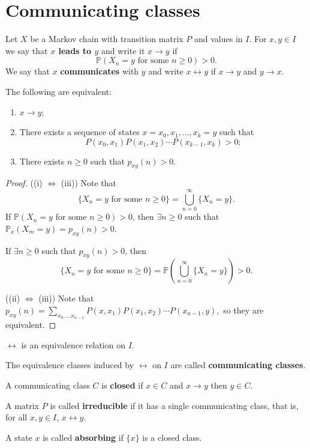\documentclass[a4paper]{article}
\begin{document}
\section{Communicating classes}
\begin{definition}
    Let $X$ be a Markov chain with transition matrix $P$ and values in $I$. For $x, y \in I$ we say that \textbf{$x$ leads to $y$} and write it $x \rightarrow y$ if
    $$
    \mathbb{P}(X_n = y \text{ for some }n \ge 0) > 0. 
    $$
    We say that $x$ \textbf{communicates} with $y$ and write $x \leftrightarrow y$ if $x \rightarrow y$ and $y \rightarrow x$.  
\end{definition}

\begin{theorem}
	The following are equivalent: 
	\begin{enumerate}[label=(\roman*)]
		\item $x \rightarrow y$;
		\item There exists a sequence of states $x = x_0, x_1, \dots, x_k = y$ such that 
		$$P(x_0, x_1)P(x_1, x_2) \cdots P(x_{k - 1}, x_k) > 0;$$
		\item There exists $n \ge 0$ such that $p_{xy}(n) > 0$.
	\end{enumerate}
\end{theorem}
\begin{proof}
    ((i) $ \Leftrightarrow $ (iii)) Note that 
    \[
        \{X_n=y \text{ for some }n\ge 0\} = \bigcup_{n=0}^{\infty}\{X_n=y\}.
    \]
    If $ \mathbb{P}(X_n = y \text{ for some }n \ge 0) > 0 $, then $ \exists n\ge 0 $ such that $ \mathbb{P}_x(X_m=y)=p_{xy}(n)>0 $.

    If $ \exists n\ge 0 $ such that $ p_{xy}(n)>0 $, then 
    \[
        \{X_n=y \text{ for some }n\ge 0\}=\mathbb{P}\left( \bigcup_{n=0}^{\infty}\{X_n=y\} \right)>0.
    \]

    ((ii) $ \Leftrightarrow  $ (iii)) Note that $ p_{xy}(n) = \sum_{x_0,\dots x_{n-1}} P(x,x_1)P(x_1,x_2)\cdots P(x_{n-1},y), $
    so they are equivalent.
\end{proof}
\begin{corollary}
    $ \leftrightarrow $ is an equivalence relation on $I$.
\end{corollary}
\begin{definition}
	The equivalence classes induced by $\leftrightarrow$ on $I$ are called \textbf{communicating classes}.

    A communicating class $C$ is \textbf{closed} if $x \in C$ and $x \rightarrow y$ then $y \in C$.

    A matrix $P$ is called \textbf{irreducible} if it has a single communicating class, that is, for all $x, y \in I$, $x \leftrightarrow y$. 

    A state $x$ is called \textbf{absorbing} if $\{x\}$ is a closed class. 
\end{definition}
\end{document}
